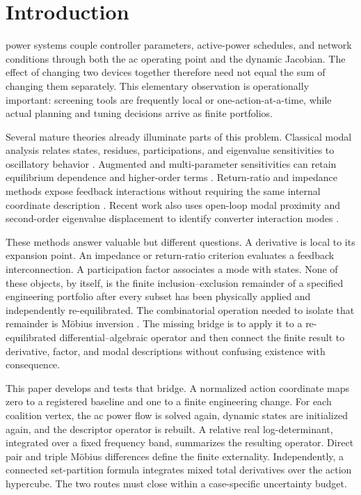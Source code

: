 \section{Introduction}
 power systems couple controller parameters,
active-power schedules, and network conditions through both the ac operating
point and the dynamic Jacobian. The effect of changing two devices together
therefore need not equal the sum of changing them separately. This elementary
observation is operationally important: screening tools are frequently local
or one-action-at-a-time, while actual planning and tuning decisions arrive as
finite portfolios.

Several mature theories already illuminate parts of this problem. Classical
modal analysis relates states, residues, participations, and eigenvalue
sensitivities to oscillatory behavior
\cite{perezarriaga1982sma,pagola1989sensitivities}. Augmented and
multi-parameter sensitivities can retain equilibrium dependence and
higher-order terms \cite{nam2000eigensensitivity,zamoracardenas2013multiparameter}.
Return-ratio and impedance methods expose feedback interactions without
requiring the same internal coordinate description
\cite{macfarlane1970return,sun2011impedance,rygg2016sequence}. Recent work
also uses open-loop modal proximity and second-order eigenvalue displacement to
identify converter interaction modes \cite{dewangan2026interaction}.

These methods answer valuable but different questions. A derivative is local
to its expansion point. An impedance or return-ratio criterion evaluates a
feedback interconnection. A participation factor associates a mode with
states. None of these objects, by itself, is the finite inclusion--exclusion
remainder of a specified engineering portfolio after every subset has been
physically applied and independently re-equilibrated. The combinatorial
operation needed to isolate that remainder is M\"obius inversion
\cite{rota1964mobius,grabisch1997kadditive}. The missing bridge is to apply it
to a re-equilibrated differential--algebraic operator and then connect the
finite result to derivative, factor, and modal descriptions without confusing
existence with consequence.

This paper develops and tests that bridge. A normalized action coordinate
maps zero to a registered baseline and one to a finite engineering change.
For each coalition vertex, the ac power flow is solved again, dynamic states
are initialized again, and the descriptor operator is rebuilt. A relative
real log-determinant, integrated over a fixed frequency band, summarizes the
resulting operator. Direct pair and triple M\"obius differences define the
finite externality. Independently, a connected set-partition formula
integrates mixed total derivatives over the action hypercube. The two routes
must close within a case-specific uncertainty budget.


